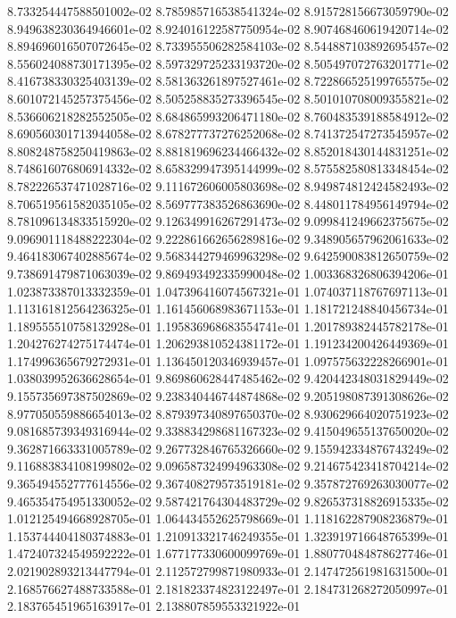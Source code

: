 8.733254447588501002e-02
8.785985716538541324e-02
8.915728156673059790e-02
8.949638230364946601e-02
8.924016122587750954e-02
8.907468460619420714e-02
8.894696016507072645e-02
8.733955506282584103e-02
8.544887103892695457e-02
8.556024088730171395e-02
8.597329725233193720e-02
8.505497072763201771e-02
8.416738330325403139e-02
8.581363261897527461e-02
8.722866525199765575e-02
8.601072145257375456e-02
8.505258835273396545e-02
8.501010708009355821e-02
8.536606218282552505e-02
8.684865993206471180e-02
8.760483539188584912e-02
8.690560301713944058e-02
8.678277737276252068e-02
8.741372547273545957e-02
8.808248758250419863e-02
8.881819696234466432e-02
8.852018430144831251e-02
8.748616076806914332e-02
8.658329947395144999e-02
8.575582580813348454e-02
8.782226537471028716e-02
9.111672606005803698e-02
8.949874812424582493e-02
8.706519561582035105e-02
8.569777383526863690e-02
8.448011784956149794e-02
8.781096134833515920e-02
9.126349916267291473e-02
9.099841249662375675e-02
9.096901118488222304e-02
9.222861662656289816e-02
9.348905657962061633e-02
9.464183067402885674e-02
9.568344279469963298e-02
9.642590083812650759e-02
9.738691479871063039e-02
9.869493492335990048e-02
1.003368326806394206e-01
1.023873387013332359e-01
1.047396416074567321e-01
1.074037118767697113e-01
1.113161812564236325e-01
1.161456068983671153e-01
1.181721248840456734e-01
1.189555510758132928e-01
1.195836968683554741e-01
1.201789382445782178e-01
1.204276274275174474e-01
1.206293810524381172e-01
1.191234200426449369e-01
1.174996365679272931e-01
1.136450120346939457e-01
1.097575632228266901e-01
1.038039952636628654e-01
9.869860628447485462e-02
9.420442348031829449e-02
9.155735697387502869e-02
9.238340446744874868e-02
9.205198087391308626e-02
8.977050559886654013e-02
8.879397340897650370e-02
8.930629664020751923e-02
9.081685739349316944e-02
9.338834298681167323e-02
9.415049655137650020e-02
9.362871663331005789e-02
9.267732846765326660e-02
9.155942334876743249e-02
9.116883834108199802e-02
9.096587324994963308e-02
9.214675423418704214e-02
9.365494552777614556e-02
9.367408279573519181e-02
9.357872769263030077e-02
9.465354754951330052e-02
9.587421764304483729e-02
9.826537318826915335e-02
1.012125494668928705e-01
1.064434552625798669e-01
1.118162287908236879e-01
1.153744404180374883e-01
1.210913321746249355e-01
1.323919716648765399e-01
1.472407324549592222e-01
1.677177330600099769e-01
1.880770484878627746e-01
2.021902893213447794e-01
2.112572799871980933e-01
2.147472561981631500e-01
2.168576627488733588e-01
2.181823374823122497e-01
2.184731268272050997e-01
2.183765451965163917e-01
2.138807859553321922e-01
